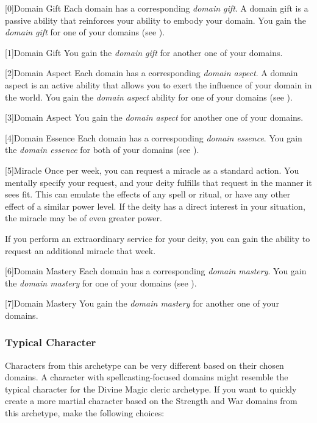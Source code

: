         [0]{Domain Gift}
        Each domain has a corresponding \textit{domain gift}.
        A domain gift is a passive ability that reinforces your ability to embody your domain.
        You gain the \textit{domain gift} for one of your domains (see ).

        [1]{Domain Gift}
        You gain the \textit{domain gift} for another one of your domains.

        [2]{Domain Aspect}
        Each domain has a corresponding \textit{domain aspect}.
        A domain aspect is an active ability that allows you to exert the influence of your domain in the world.
        You gain the \textit{domain aspect} ability for one of your domains (see ).

        [3]{Domain Aspect}
        You gain the \textit{domain aspect} for another one of your domains.

        [4]{Domain Essence}
        Each domain has a corresponding \textit{domain essence}.
        You gain the \textit{domain essence} for both of your domains (see ).

        [5]{Miracle}
        Once per week, you can request a miracle as a standard action.
        You mentally specify your request, and your deity fulfills that request in the manner it sees fit.
        This can emulate the effects of any spell or ritual, or have any other effect of a similar power level.
        If the deity has a direct interest in your situation, the miracle may be of even greater power.

        If you perform an extraordinary service for your deity, you can gain the ability to request an additional miracle that week.

        [6]{Domain Mastery}
        Each domain has a corresponding \textit{domain mastery}.
        You gain the \textit{domain mastery} for one of your domains (see ).

        [7]{Domain Mastery}
        You gain the \textit{domain mastery} for another one of your domains.

        \subsubsection{Typical Character}
            Characters from this archetype can be very different based on their chosen domains.
            A character with spellcasting-focused domains might resemble the typical character for the Divine Magic cleric archetype.
            If you want to quickly create a more martial character based on the Strength and War domains from this archetype, make the following choices:

